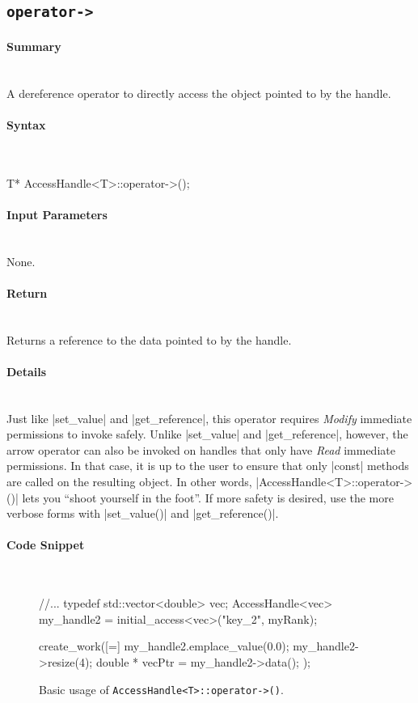 \subsection{\texttt{operator->}}

\paragraph{Summary}\mbox{}\\
A dereference operator to directly access the object 
pointed to by the handle.

\paragraph{Syntax}\mbox{}\\
\begin{CppCode}
T* AccessHandle<T>::operator->();
\end{CppCode}

\paragraph{Input Parameters}\mbox{}\\
None.

\paragraph{Return}\mbox{}\\
Returns a reference to the data pointed to by the handle.

\paragraph{Details}\mbox{}\\
Just like |set_value| and |get_reference|, this operator
requires {\it Modify} immediate permissions to invoke safely.  Unlike 
|set_value| and |get_reference|, however, the arrow operator can
also be invoked on handles that only have {\it Read} immediate permissions.  In
that case, it is up to the user to ensure that only |const| methods are
called on the resulting object.  In other words,
|AccessHandle<T>::operator->()| lets you ``shoot yourself in the foot''.
If more safety is desired, use the more  verbose forms with
|set_value()| and |get_reference()|.


\paragraph{Code Snippet}\mbox{}\\
\begin{figure}[!h]
\begin{CppCodeNumb}
//...
typedef std::vector<double> vec;
AccessHandle<vec> my_handle2 = initial_access<vec>("key_2", myRank);

create_work([=]{
  my_handle2.emplace_value(0.0);
  my_handle2->resize(4);
  double * vecPtr = my_handle2->data();    
});
\end{CppCodeNumb}
\label{fig:fe_api_arrow}
\caption{Basic usage of \texttt{AccessHandle<T>::operator->()}.}
\end{figure}

